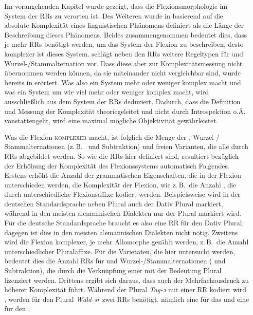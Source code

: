\begin{exe}
\begin{exe}
Im vorangehenden Kapitel wurde gezeigt, dass die Flexionsmorphologie im System der RRs zu verorten ist. Des Weiteren wurde in  basierend auf \citet{Miestamo2008} die absolute Komplexität eines linguistischen Phänomens definiert als die Länge der Beschreibung dieses Phänomens. Beides zusammengenommen bedeutet dies, dass je mehr RRs benötigt werden, um das System der Flexion zu beschreiben, desto komplexer ist dieses System. \citet{Stump2001} schlägt neben den RRs weitere Regeltypen für  und Wur\-zel-/Stamm\-al\-ter\-na\-tion vor. Dass diese aber zur Komplexitätsmessung nicht übernommen werden können, da sie miteinander nicht vergleichbar sind, wurde bereits in  erörtert. Was also ein System mehr oder weniger komplex macht und was ein System um wie viel mehr oder weniger komplex macht, wird ausschließlich aus dem System der RRs deduziert. Dadurch, dass die Definition und Messung der Komplexität theoriegeleitet und nicht durch Introspektion o.Ä. vonstattengeht, wird eine maximal mögliche Objektivität gewährleistet. 

Was die Flexion \textsc{komplexer} macht, ist folglich die Menge der , \mbox{Wur\-zel-/} Stamm\-al\-ter\-na\-tio\-nen (z.\,B.\  und Subtraktion) und freien Varianten, die alle durch RRs abgebildet werden. So wie die RRs hier definiert sind, resultiert bezüglich der Erhöhung der Komplexität des Flexionssystems automatisch Folgendes. Erstens erhöht die Anzahl der grammatischen Eigenschaften, die in der Flexion unterschieden werden, die Komplexität der Flexion, wie z.\,B.\ die Anzahl , die durch unterschiedliche Flexionsaffixe kodiert werden. Beispielsweise wird in der deutschen Standardsprache neben Plural auch der Dativ Plural markiert, während in den meisten alemannischen Dialekten nur der Plural markiert wird. Für die deutsche Standardsprache braucht es also eine RR für den Dativ Plural, dagegen ist dies in den meisten alemannischen Dialekten nicht nötig. Zweitens wird die Flexion komplexer, je mehr Allomorphe gezählt werden, z.\,B.\ die Anzahl unterschiedlicher Pluralaffixe. Für die Varietäten, die hier untersucht werden, bedeutet dies die Anzahl RRs für  und Wur\-zel-/Stamm\-al\-ter\-na\-tio\-nen ( und Subtraktion), die durch die Verknüpfung einer  mit der Bedeutung Plural lizenziert werden. Drittens ergibt sich daraus, dass auch der Mehrfachausdruck zu höherer Komplexität führt. Während der Plural \textit{Tag-ə} mit einer RR kodiert wird , werden für den Plural \textit{Wäld-ər} zwei RRs benötigt, nämlich eine für das   und eine für den  .


\end{exe}
\end{exe}
